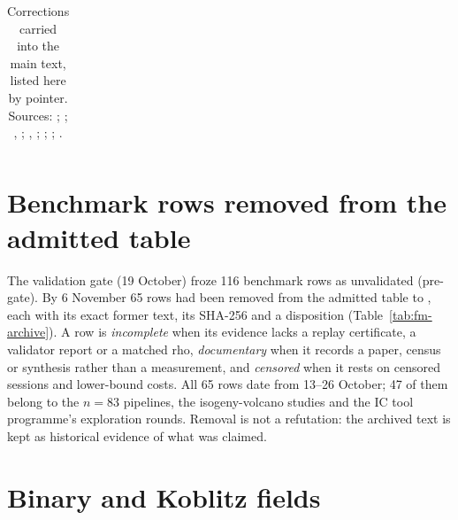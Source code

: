 \begin{table}[tbp]
\begin{tabularx}{\linewidth}{@{}>{\raggedright\arraybackslash}p{0.2\linewidth}>{\raggedright\arraybackslash}X>{\raggedright\arraybackslash}X>{\raggedright\arraybackslash}p{0.17\linewidth}@{}}
\bottomrule
\end{tabularx}
\caption[]{Corrections carried into the main text, listed here by pointer.
Sources: ;
;
,
;
,
;
;
;
.}
\label{tab:corr-xref}
\end{table}

\section{Benchmark rows removed from the admitted table}\label{sec:corr-archive}

The validation gate (19 October) froze 116 benchmark rows as unvalidated
(pre-gate). By 6 November 65 rows had been removed from the admitted table
to , each with its
exact former text, its SHA-256 and a disposition (Table~\ref{tab:fm-archive}).
A row is \emph{incomplete} when its evidence lacks a replay certificate, a
validator report or a matched rho, \emph{documentary} when it records a
paper, census or synthesis rather than a measurement, and \emph{censored} when it rests on
censored sessions and lower-bound costs. All 65 rows date from 13--26 October; 47 of them
belong to the $n=83$ pipelines, the isogeny-volcano studies and the IC tool
programme's exploration rounds. Removal is not a refutation: the archived
text is kept as historical evidence of what was claimed.

\begin{table}[tbp]
\centering\footnotesize

\caption[]{Benchmark rows removed from the admitted table, by topic and by
the date in their entry name. Topics are assigned by directory-name
keyword in  (first match wins); counts from
 via .}
\label{tab:fm-archive}
\end{table}

\section{Binary and Koblitz fields}\label{sec:corr-binary}

